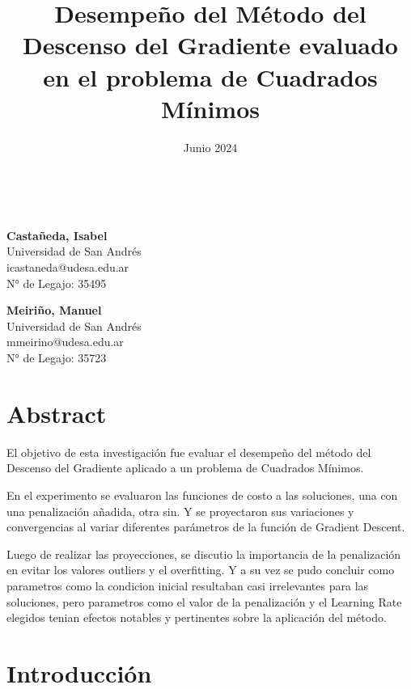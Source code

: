 \documentclass{article}
\title {Desempeño del Método del Descenso del Gradiente evaluado en el problema de Cuadrados Mínimos}
\date{Junio 2024}
\makeatletter
\renewcommand{\maketitle}{
    \begin{center}
        {\huge \@title}\\
        \vspace{10pt} 
        {\Large \@date}
    \end{center}
}
\makeatother
\begin{document}

\maketitle
\thispagestyle{plain}

\begin{center}

\large
\textbf{Castañeda, Isabel}\\
Universidad de San Andrés\\
icastaneda@udesa.edu.ar\\
N° de Legajo: 35495\\
\vspace{1\baselineskip}

\large
\textbf{Meiriño, Manuel}\\
Universidad de San Andrés\\
mmeirino@udesa.edu.ar\\
N° de Legajo: 35723
\end{center}

\vspace{0.5cm}

\section*{Abstract}
\normalsize
 

\noindent El objetivo de esta investigación fue evaluar el desempeño del método del Descenso del Gradiente aplicado a un problema de Cuadrados Mínimos. 
\vspace{\baselineskip}

\noindent En el experimento se evaluaron las funciones de costo a las soluciones, una con una penalización añadida, otra sin. Y se proyectaron sus variaciones y convergencias al variar diferentes parámetros de la función de Gradient Descent. 
\vspace{\baselineskip}

\noindent Luego de realizar las proyecciones, se discutio la importancia de la penalización en evitar los valores outliers y el overfitting. Y a su vez se pudo concluir como parametros como la condicion inicial resultaban casi irrelevantes para las soluciones, pero parametros como el valor de la penalización y el Learning Rate elegidos tenian efectos notables y pertinentes sobre la aplicación del método. 


\section*{Introducción}
\end{document}
